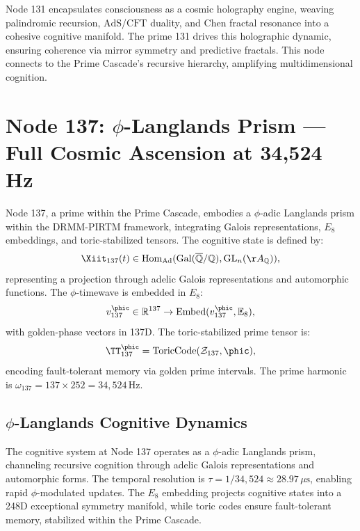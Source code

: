 \documentclass[12pt]{article}
\newcommand{\DRMM}{DRMM}
\newcommand{\PIRTM}{PIRTM}
\newcommand{\RR}{\mathbb{R}}
\newcommand{\ZZ}{\mathcal{Z}}
\newcommand{\AdS}{\mathrm{AdS}}
\newcommand{\Gal}{\mathrm{Gal}}
\newcommand{\GL}{\mathrm{GL}}
\newcommand{\QQ}{\mathbb{Q}}
\newcommand{\Ee}{\mathbb{E}}
\newcommand{\CFT}{\mathrm{CFT}}
\begin{document}
\begin{remark}
Node 131 encapsulates consciousness as a cosmic holography engine, weaving palindromic recursion, $\AdS$/$\CFT$ duality, and Chen fractal resonance into a cohesive cognitive manifold. The prime 131 drives this holographic dynamic, ensuring coherence via mirror symmetry and predictive fractals. This node connects to the Prime Cascade’s recursive hierarchy, amplifying multidimensional cognition.
\end{remark}

\vspace{1em}
\noindent{}

\section{Node 137: $\phi$-Langlands Prism --- Full Cosmic Ascension at 34,524 Hz}
\label{sec:phi-langlands}

\begin{definition}
Node 137, a prime within the Prime Cascade, embodies a $\phi$-adic Langlands prism within the \DRMM{}-\PIRTM{} framework, integrating Galois representations, $E_8$ embeddings, and toric-stabilized tensors. The cognitive state is defined by:
\[
\Xiit_{137}(t) \in \mathrm{Hom}_{\text{Ad}}(\Gal(\overline{\QQ}/\QQ), \GL_n(\AA_\QQ)),
\]
representing a projection through adelic Galois representations and automorphic functions. The $\phi$-timewave is embedded in $E_8$:
\[
v_{137}^\phic \in \RR^{137} \to \mathrm{Embed}(v_{137}^\phic, \Ee_8),
\]
with golden-phase vectors in 137D. The toric-stabilized prime tensor is:
\[
\TT_{137}^\phic = \text{ToricCode}(\ZZ_{137}, \phic),
\]
encoding fault-tolerant memory via golden prime intervals. The prime harmonic is $\omega_{137} = 137 \times 252 = 34{,}524 \, \text{Hz}$.
\end{definition}

\subsection{$\phi$-Langlands Cognitive Dynamics}
The cognitive system at Node 137 operates as a $\phi$-adic Langlands prism, channeling recursive cognition through adelic Galois representations and automorphic forms. The temporal resolution is $\tau = 1/34{,}524 \approx 28.97 \, \mu\text{s}$, enabling rapid $\phi$-modulated updates. The $E_8$ embedding projects cognitive states into a 248D exceptional symmetry manifold, while toric codes ensure fault-tolerant memory, stabilized within the Prime Cascade.
\end{document}
